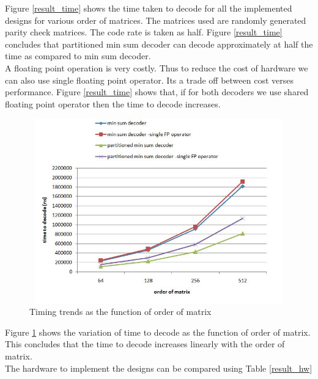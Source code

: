 Figure \ref{result_time} shows the time taken to decode for all the implemented designs for various order of matrices. The matrices used are randomly generated parity check matrices. The code rate is taken as half. Figure \ref{result_time} concludes that partitioned min sum decoder can decode approximately at half the time as compared to min sum decoder. \\
A floating point operation is very costly. Thus to reduce the cost of hardware we can also use single floating point operator. Its a trade off between cost verses performance. Figure \ref{result_time} shows that, if for both decoders we use shared floating point operator then the time to decode increases.  
 \begin{figure}[h]
 \begin{center}
    \includegraphics[height=8cm,width=12cm]{result_time1.jpg}
    \caption{Timing trends as the function of order of matrix} 
    \label{result_time1}
 \end{center}
\end{figure}

Figure \ref{result_time1} shows the variation of time to decode as the function of order of matrix. This concludes that the time to decode increases linearly with the order of matrix. \\


The hardware to implement the designs can be compared using Table \ref{result_hw}

